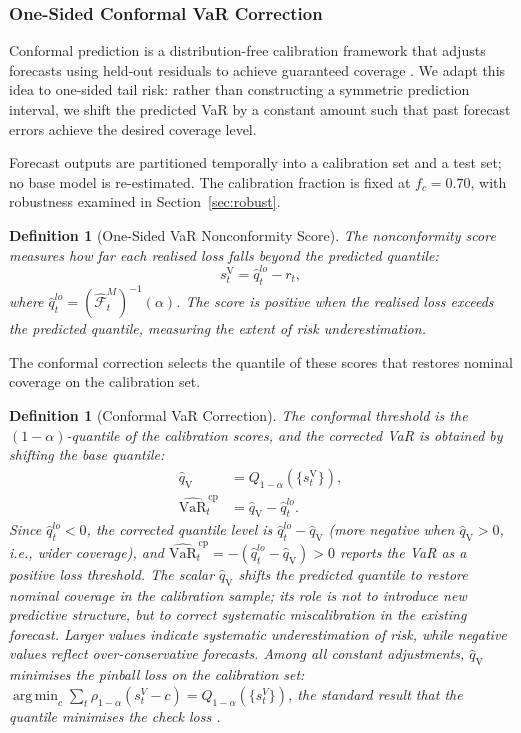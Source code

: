 \documentclass[preprint,11pt,authoryear]{elsarticle}
\DeclareMathOperator*{\argmin}{arg\,min}
\newtheorem{definition}[theorem]{Definition}
\newcommand{\VaR}{\mathrm{VaR}}
\newcommand{\1}{\boldsymbol{1}}
\newcommand{\qV}{\hat{q}_{\scriptscriptstyle\mathrm{V}}}
\newcommand{\Fhat}{\hat{\mathcal{F}}}
\begin{document}
	\subsubsection{One-Sided Conformal VaR Correction}
	\label{sec:cqr_var}
	
	Conformal prediction is a distribution-free calibration
	framework that adjusts forecasts using held-out residuals to
	achieve guaranteed coverage
	\citep{vovk2005algorithmic, romano2019conformalized}. We
	adapt this idea to one-sided tail risk: rather than
	constructing a symmetric prediction interval, we shift the
	predicted VaR by a constant amount such that past forecast
	errors achieve the desired coverage level.
	
	Forecast outputs are partitioned temporally into a calibration set and a test set; no base model is re-estimated. The
	calibration fraction is fixed at $f_c = 0.70$, with robustness examined in Section~\ref{sec:robust}.
	
	\begin{definition}[One-Sided VaR Nonconformity Score]
		\label{def:var_score}
		The nonconformity score measures how far each realised
		loss falls beyond the predicted quantile:
		\begin{equation}
			s_t^{\mathrm{V}} = \hat{q}_t^{lo} - r_t,
		\end{equation}
		where $\hat{q}_t^{lo} = (\Fhat_t^M)^{-1}(\alpha)$. The
		score is positive when the realised loss exceeds the
		predicted quantile, measuring the extent of risk
		underestimation.
	\end{definition}
	
	The conformal correction selects the quantile of these scores
	that restores nominal coverage on the calibration set.
	
	\begin{definition}[Conformal VaR Correction]
		\label{def:var_correction}
		The conformal threshold is the $(1-\alpha)$-quantile of
		the calibration scores, and the corrected VaR is obtained
		by shifting the base quantile:
		\begin{align}
			\qV &= Q_{1-\alpha}(\{s_t^{\mathrm{V}}\}), \\
			\widehat{\VaR}_t^{\,\mathrm{cp}}
			&= \qV - \hat{q}_t^{lo}. \label{eq:var_cp}
		\end{align}
		Since $\hat{q}_t^{lo} < 0$, the corrected quantile level is $\hat{q}_t^{lo} - \qV$ (more negative when $\qV > 0$, i.e., wider coverage), and $\widehat{\VaR}_t^{\,\mathrm{cp}} = -(\hat{q}_t^{lo} - \qV) > 0$ reports the VaR as a positive loss threshold.
		The scalar $\qV$ shifts the predicted quantile to restore
		nominal coverage in the calibration sample; its role is not to introduce new predictive structure, but to correct systematic miscalibration in the existing forecast. Larger values indicate systematic
		underestimation of risk, while negative values reflect
		over-conservative forecasts. Among all constant
		adjustments, $\qV$ minimises the pinball loss on the
		calibration set: $\argmin_c \sum_t
		\rho_{1-\alpha}(s_t^V - c) = Q_{1-\alpha}(\{s_t^V\})$,
		the standard result that the quantile minimises the check
		loss \citep[Theorem~1.1]{koenker2005quantile}.
	\end{definition}
\end{document}
